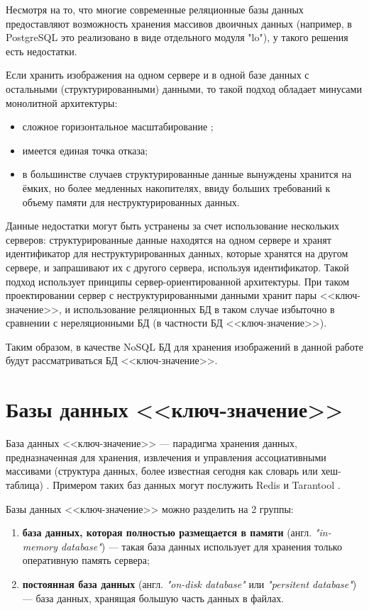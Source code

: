 Несмотря на то, что многие современные реляционные базы данных предоставляют возможность хранения массивов двоичных данных (например, в PostgreSQL\cite{psql} это реализовано в виде отдельного модуля "lo"\cite{lo}), у такого решения есть недостатки. 

Если хранить изображения на одном сервере и в одной базе данных с остальными (структурированными) данными, то такой подход обладает минусами монолитной архитектуры:
\begin{itemize}
    \item сложное горизонтальное масштабирование \cite{scal};
    \item имеется единая точка отказа\cite{dp};
    \item в большинстве случаев структурированные данные вынуждены хранится на ёмких, но более медленных накопителях, ввиду больших требований к объему памяти для неструктурированных данных.
\end{itemize}

Данные недостатки могут быть устранены за счет использование нескольких серверов: структурированные данные находятся на одном сервере и хранят идентификатор для неструктурированных данных, которые хранятся на другом сервере, и запрашивают их с другого сервера, используя идентификатор. Такой подход использует принципы сервер-ориентированной архитектуры. При таком проектировании сервер с неструктурированными данными хранит пары <<ключ-значение>>, и использование реляционных БД в таком случае избыточно в сравнении с нереляционными БД (в частности БД <<ключ-значение>>\cite{kvstore}).

Таким образом, в качестве NoSQL БД для хранения изображений в данной работе будут рассматриваться БД <<ключ-значение>>.

\section{Базы данных <<ключ-значение>>}

База данных <<ключ-значение>> --- парадигма хранения данных, предназначенная для хранения, извлечения и управления ассоциативными массивами (структура данных, более известная сегодня как словарь или хеш-таблица) \cite{kvstore}. Примером таких баз данных могут послужить Redis \cite{redis} и Tarantool \cite{tarantool}.

Базы данных <<ключ-значение>> можно разделить на 2 группы:
\begin{enumerate}
    \item \textbf{база данных, которая полностью размещается в памяти} (англ. \textit{"in-memory database"}) --- такая база данных использует для хранения только оперативную память сервера;
    \item \textbf{постоянная база данных} (англ. \textit{"on-disk database"} или \textit{"persitent database"}) --- база данных, хранящая большую часть данных в файлах.
\end{enumerate}

